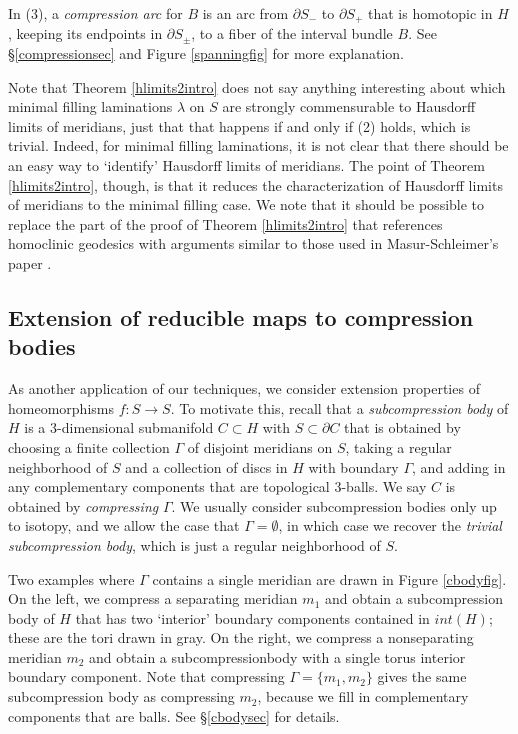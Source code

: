 \documentclass[12pt]{amsart}
\theoremstyle{definition}
\theoremstyle{remark}
\begin{document}
In (3), a \emph {compression arc} for $B$ is an arc from $\partial S_-$ to $\partial S_+$ that is homotopic in $H$, keeping its endpoints in $\partial S_\pm$, to a fiber of the interval bundle $B$. See \S \ref{compressionsec} and Figure \ref{spanningfig} for more explanation.

Note that Theorem \ref{hlimits2intro} does not say anything interesting about which {minimal filling} laminations $\lambda$ on $S$ are strongly commensurable to Hausdorff limits of meridians, just that that happens if and only if (2) holds, which is trivial. Indeed, for minimal filling laminations, it is not clear that there {should} be an easy way to `identify' Hausdorff limits of meridians. The point of Theorem \ref{hlimits2intro}, though, is that it reduces the characterization of Hausdorff limits of meridians to the minimal filling case. We note that it should be possible to replace the part of the proof of Theorem \ref{hlimits2intro} that references homoclinic geodesics with arguments similar to those used in Masur-Schleimer's paper \cite{masur2013geometry}.

\subsection{Extension of reducible maps to compression bodies}
As another application of our techniques, we consider extension properties of  homeomorphisms $f : S \longrightarrow S$. To motivate this, recall that a  \emph{subcompression body} of $H$ is a $3$-dimensional submanifold $C \subset H$ with $S \subset \partial C$ that is obtained by choosing a finite collection $\Gamma $ of disjoint meridians on $S$, taking a regular neighborhood of $S$ and a collection of discs in $H$ with boundary $\Gamma$, and adding in any complementary components that are topological $3$-balls. We say $C$ is obtained by \emph{compressing} $\Gamma$. We usually consider subcompression bodies only up to isotopy, and we allow the case that $\Gamma=\emptyset$, in which case we recover the \emph{trivial subcompression body}, which is just a regular neighborhood of $S$. 

Two examples where $\Gamma$ contains a single meridian are drawn in Figure \ref{cbodyfig}. On the left, we compress a separating meridian $m_1$ and obtain a subcompression body of $H$ that has two `interior' boundary components contained in $int(H)$; these are the tori drawn in gray. On the right, we compress a nonseparating meridian $m_2$ and obtain a subcompressionbody with a single torus interior boundary component. Note that compressing $\Gamma=\{m_1,m_2\}$ gives the same subcompression body as compressing $m_2$, because we fill in complementary components that are balls. See \S \ref{cbodysec} for details.
\end{document}
